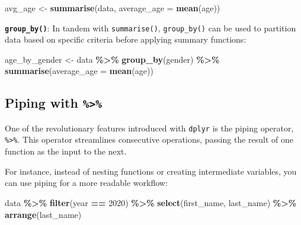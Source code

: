\documentclass[
  b5paper]{book}
\newenvironment{Shaded}{\begin{snugshade}}{\end{snugshade}}
\newcommand{\AttributeTok}[1]{\textcolor[rgb]{0.13,0.29,0.53}{#1}}
\newcommand{\DecValTok}[1]{\textcolor[rgb]{0.00,0.00,0.81}{#1}}
\newcommand{\FunctionTok}[1]{\textcolor[rgb]{0.13,0.29,0.53}{\textbf{#1}}}
\newcommand{\NormalTok}[1]{#1}
\newcommand{\OtherTok}[1]{\textcolor[rgb]{0.56,0.35,0.01}{#1}}
\newcommand{\SpecialCharTok}[1]{\textcolor[rgb]{0.81,0.36,0.00}{\textbf{#1}}}
\begin{document}
\begin{Shaded}
\begin{Highlighting}[]
\NormalTok{avg\_age }\OtherTok{\textless{}{-}} \FunctionTok{summarise}\NormalTok{(data, }\AttributeTok{average\_age =} \FunctionTok{mean}\NormalTok{(age))}
\end{Highlighting}
\end{Shaded}

\textbf{\texttt{group\_by()}}: In tandem with \texttt{summarise()}, \texttt{group\_by()} can be used to partition data based on specific criteria before applying summary functions:

\begin{Shaded}
\begin{Highlighting}[]
\NormalTok{age\_by\_gender }\OtherTok{\textless{}{-}}\NormalTok{ data }\SpecialCharTok{\%\textgreater{}\%}
                 \FunctionTok{group\_by}\NormalTok{(gender) }\SpecialCharTok{\%\textgreater{}\%}
                 \FunctionTok{summarise}\NormalTok{(}\AttributeTok{average\_age =} \FunctionTok{mean}\NormalTok{(age))}
\end{Highlighting}
\end{Shaded}

\hypertarget{piping-with}{%
\subsection*{\texorpdfstring{Piping with \texttt{\%\textgreater{}\%}}{Piping with \%\textgreater\%}}\label{piping-with}}

One of the revolutionary features introduced with \texttt{dplyr} is the piping operator, \texttt{\%\textgreater{}\%}. This operator streamlines consecutive operations, passing the result of one function as the input to the next.

For instance, instead of nesting functions or creating intermediate variables, you can use piping for a more readable workflow:

\begin{Shaded}
\begin{Highlighting}[]
\NormalTok{data }\SpecialCharTok{\%\textgreater{}\%}
  \FunctionTok{filter}\NormalTok{(year }\SpecialCharTok{==} \DecValTok{2020}\NormalTok{) }\SpecialCharTok{\%\textgreater{}\%}
  \FunctionTok{select}\NormalTok{(first\_name, last\_name) }\SpecialCharTok{\%\textgreater{}\%}
  \FunctionTok{arrange}\NormalTok{(last\_name)}
\end{Highlighting}
\end{Shaded}
\end{document}
